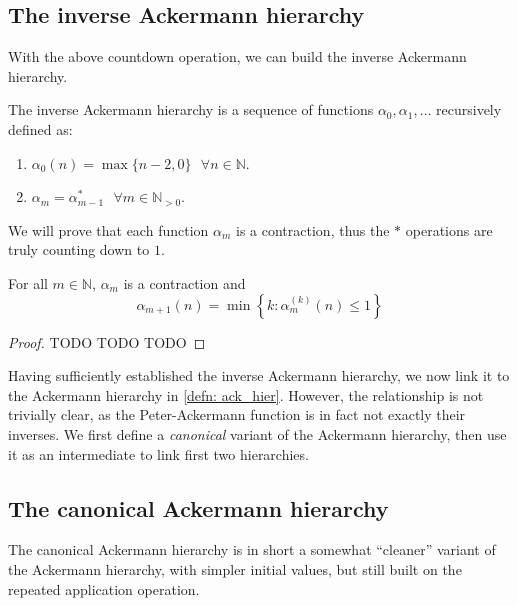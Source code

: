 \subsection{The inverse Ackermann hierarchy}

With the above countdown operation, we can build the inverse Ackermann hierarchy.

\begin{defn} \label{defn: inv_ack_hier}
The inverse Ackermann hierarchy is a sequence of functions $\alpha_0, \alpha_1, \ldots $ recursively defined as:
\begin{enumerate}
	\item $\alpha_0(n) = \max\{n-2, 0\} \ \ \ \forall n \in \mathbb{N}$.
	\item $\alpha_m = \alpha_{m-1}^*  \ \ \ \forall m\in \mathbb{N}_{>0}$.
\end{enumerate}
\end{defn}

We will prove that each function $\alpha_m$ is a contraction, thus the $*$ operations are truly counting down to $1$.

\begin{thm} \label{thm: inv_ack_countdown}
For all $m\in\mathbb{N}$, $\alpha_m$ is a contraction and
\begin{equation}
\alpha_{m+1}(n) = \min\left\{ k : \alpha_m^{(k)}(n) \le 1 \right\}
\end{equation}
\end{thm}

\begin{proof}
TODO TODO TODO
\end{proof}

Having sufficiently established the inverse Ackermann hierarchy, we now link it to the Ackermann hierarchy in \cref{defn: ack_hier}. However, the relationship is not trivially clear, as the Peter-Ackermann function is in fact not exactly their inverses. We first define a \textit{canonical} variant of the Ackermann hierarchy, then use it as an intermediate to link first two hierarchies.

\subsection{The canonical Ackermann hierarchy}

The canonical Ackermann hierarchy is in short a somewhat ``cleaner'' variant of the Ackermann hierarchy, with simpler initial values, but still built on the repeated application operation.

